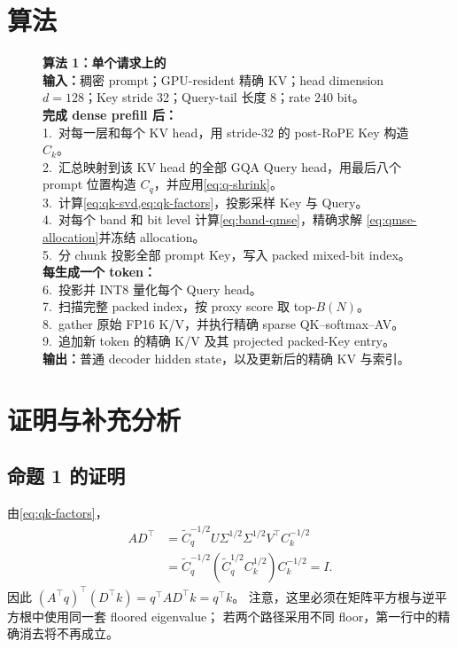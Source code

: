 \section{算法}
\label{app:algorithm}

\begin{figure}[h]
\small
\begin{minipage}{0.96\linewidth}
\textbf{算法 1：单个请求上的 \method}\\[2pt]
\textbf{输入：}稠密 prompt；GPU-resident 精确 KV；head dimension
$d=128$；Key stride 32；Query-tail 长度 8；rate 240 bit。\\
\textbf{完成 dense prefill 后：}\\
1.\ 对每一层和每个 KV head，用 stride-32 的 post-RoPE Key 构造 $C_k$。\\
2.\ 汇总映射到该 KV head 的全部 GQA Query head，用最后八个 prompt
位置构造 $C_q$，并应用\cref{eq:q-shrink}。\\
3.\ 计算\cref{eq:qk-svd,eq:qk-factors}，投影采样 Key 与 Query。\\
4.\ 对每个 band 和 bit level 计算\cref{eq:band-qmse}，精确求解
\cref{eq:qmse-allocation}并冻结 allocation。\\
5.\ 分 chunk 投影全部 prompt Key，写入 packed mixed-bit index。\\
\textbf{每生成一个 token：}\\
6.\ 投影并 INT8 量化每个 Query head。\\
7.\ 扫描完整 packed index，按 proxy score 取 top-$B(N)$。\\
8.\ gather 原始 FP16 K/V，并执行精确 sparse QK--softmax--AV。\\
9.\ 追加新 token 的精确 K/V 及其 projected packed-Key entry。\\
\textbf{输出：}普通 decoder hidden state，以及更新后的精确 KV 与索引。
\end{minipage}
\end{figure}



\section{证明与补充分析}
\label{app:proofs}

\subsection{命题 1 的证明}

由\cref{eq:qk-factors}，
\begin{align}
 AD^\top
 &=
 \widetilde C_q^{-1/2}U\Sigma^{1/2}
 \Sigma^{1/2}V^\top C_k^{-1/2}\nonumber\\
 &=
 \widetilde C_q^{-1/2}
 (\widetilde C_q^{1/2}C_k^{1/2})
 C_k^{-1/2}=I.
\end{align}
因此
$(A^\top q)^\top(D^\top k)=q^\top AD^\top k=q^\top k$。
注意，这里必须在矩阵平方根与逆平方根中使用同一套 floored eigenvalue；
若两个路径采用不同 floor，第一行中的精确消去将不再成立。

